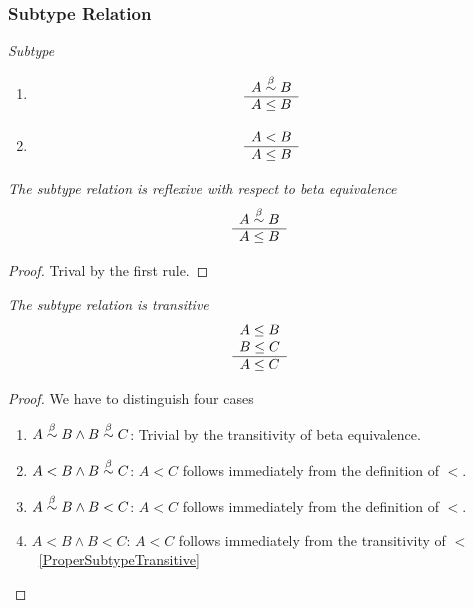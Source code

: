 \subsubsection{Subtype Relation}


\begin{definition}
    \emph{Subtype}
    \begin{enumerate}
    \item
        $$
        \begin{array}{c} 
            A \stackrel{\beta}{\sim} B
         \\ \hline 
            A \le B
        \end{array}
        $$

    \item
        $$
        \begin{array}{c} 
            A < B
         \\ \hline 
            A \le B
        \end{array}
        $$
    \end{enumerate}
\end{definition}


\begin{theorem}
    \emph{The subtype relation is reflexive with respect to beta equivalence}
    $$
    \begin{array}{c} 
        A \stackrel{\beta}{\sim} B
     \\ \hline 
        A \le B
    \end{array}
    $$
    \begin{proof} Trival by the first rule.
    \end{proof}
\end{theorem}






\begin{theorem}
    \emph{The subtype relation is transitive}
    $$
    \begin{array}{c} 
        A \le B
        \\
        B \le C
     \\ \hline 
        A \le C
    \end{array}
    $$
    \begin{proof}
        We have to distinguish four cases
        \begin{enumerate}
        \item $A \stackrel{\beta}{\sim} B \land B \stackrel{\beta}{\sim} C$: Trivial by the transitivity of
            beta equivalence.

        \item $A < B \land B \stackrel{\beta}{\sim} C$: $A < C$ follows immediately from the
            definition of $<$.

        \item $A \stackrel{\beta}{\sim} B \land B < C$: $A < C$ follows immediately from the
            definition of $<$.

        \item $A < B \land B < C$: $A < C$ follows immediately from the
            transitivity of $<$~\ref{ProperSubtypeTransitive}
        \end{enumerate}
    \end{proof}
\end{theorem}


